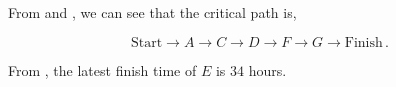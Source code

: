 \begin{subquestions}
\begin{subsubquestions}

\subsubquestion

\begin{subsubsubquestions}

\subsubsubquestion

From  and , we can see that the critical path is,

\begin{equation}
	\text{Start} \rightarrow A \rightarrow C \rightarrow D \rightarrow F \rightarrow G \rightarrow \text{Finish} \,.
\end{equation}	


\subsubsubquestion

From , the latest finish time of $E$ is $34$ hours.

\end{subsubsubquestions}

\end{subsubquestions}

\end{subquestions}

